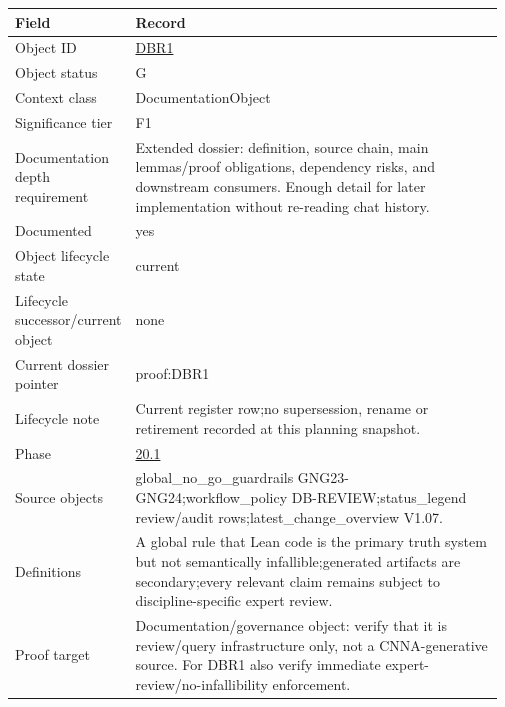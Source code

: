 \begin{longtable}{L{0.16\linewidth} L{0.81\linewidth}}
\hline
\textbf{Field} & \textbf{Record}\\
\hline
Object ID & \hyperlink{object-row-DBR1}{DBR1}\\
\hline\addlinespace[0.20em]
Object status & G\\
\hline\addlinespace[0.20em]
Context class & DocumentationObject\\
\hline\addlinespace[0.20em]
Significance tier & F1\\
\hline\addlinespace[0.20em]
Documentation depth requirement & Extended dossier: definition, source chain, main lemmas/\allowbreak{}proof obligations, dependency risks, and downstream consumers. Enough detail for later implementation without re-reading chat history.\\
\hline\addlinespace[0.20em]
Documented & yes\\
\hline\addlinespace[0.20em]
Object lifecycle state & current\\
\hline\addlinespace[0.20em]
Lifecycle successor/\allowbreak{}current object & none\\
\hline\addlinespace[0.20em]
Current dossier pointer & proof:DBR1\\
\hline\addlinespace[0.20em]
Lifecycle note & Current register row;\newline no supersession, rename or retirement recorded at this planning snapshot.\\
\hline\addlinespace[0.20em]
Phase & \hyperlink{phase-row-20-1}{20.1}\\
\hline\addlinespace[0.20em]
Source objects & global\_no\_go\_guardrails GNG23-GNG24;\newline workflow\_policy DB-REVIEW;\newline status\_legend review/\allowbreak{}audit rows;\newline latest\_change\_overview V1.07.\\
\hline\addlinespace[0.20em]
Definitions & A global rule that Lean code is the primary truth system but not semantically infallible;\newline generated artifacts are secondary;\newline every relevant claim remains subject to discipline-specific expert review.\\
\hline\addlinespace[0.20em]
Proof target & Documentation/\allowbreak{}governance object: verify that it is review/\allowbreak{}query infrastructure only, not a CNNA-generative source. For DBR1 also verify immediate expert-review/\allowbreak{}no-infallibility enforcement.\\

\end{longtable}
